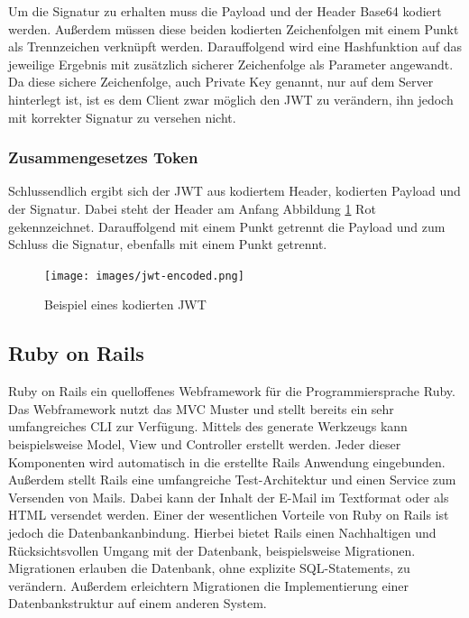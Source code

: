 \documentclass[paper=a4,fontsize=12pt,parskip=half]{scrartcl}
\begin{document}
	Um die Signatur zu erhalten muss die Payload und der Header Base64 kodiert werden. Außerdem müssen diese beiden kodierten Zeichenfolgen mit einem Punkt als Trennzeichen verknüpft werden. Darauffolgend wird eine Hashfunktion auf das jeweilige Ergebnis mit zusätzlich sicherer Zeichenfolge als Parameter angewandt. Da diese sichere Zeichenfolge, auch Private Key genannt, nur auf dem Server hinterlegt ist, ist es dem Client zwar möglich den \gls{JWT} zu verändern, ihn jedoch mit korrekter Signatur zu versehen nicht.

	\subsubsection{Zusammengesetzes Token}
	\label{sec: jwt_result}
	Schlussendlich ergibt sich der \gls{JWT} aus kodiertem Header, kodierten Payload und der Signatur. Dabei steht der Header am Anfang Abbildung \ref{fig:jwt-encoded} Rot gekennzeichnet. Darauffolgend mit einem Punkt getrennt die Payload und zum Schluss die Signatur, ebenfalls mit einem Punkt getrennt.

	\begin{figure}[h]
		\centering
		\texttt{[image: images/jwt-encoded.png]}
		\caption{Beispiel eines kodierten \gls{JWT} }
		\label{fig:jwt-encoded}
	\end{figure}

	\subsection{Ruby on Rails}
	\label{sec: rails}
	Ruby on Rails ein quelloffenes Webframework für die Programmiersprache Ruby. Das Webframework nutzt das \gls{MVC} Muster und stellt bereits ein sehr umfangreiches \gls{CLI} zur Verfügung. Mittels des generate Werkzeugs kann beispielsweise Model, View und Controller erstellt werden. Jeder dieser Komponenten wird automatisch in die erstellte Rails Anwendung eingebunden. Außerdem stellt Rails eine umfangreiche Test-Architektur und einen Service zum Versenden von Mails. Dabei kann der Inhalt der E-Mail im Textformat oder als \gls{HTML} versendet werden. Einer der wesentlichen Vorteile von Ruby on Rails ist jedoch die Datenbankanbindung. Hierbei bietet Rails einen Nachhaltigen und Rücksichtsvollen Umgang mit der Datenbank, beispielsweise Migrationen. Migrationen erlauben die Datenbank, ohne explizite SQL-Statements, zu verändern. Außerdem erleichtern Migrationen die Implementierung einer Datenbankstruktur auf einem anderen System.
\end{document}
